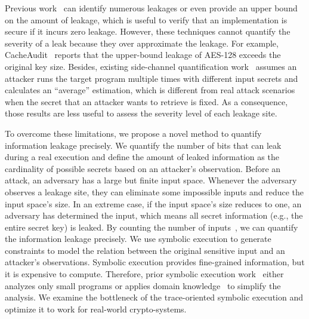 Previous work~\cite{182946,5207642} can identify numerous leakages or even provide an upper bound on the amount of leakage, which is useful to verify that an implementation is secure if it incurs zero leakage.
However, these techniques cannot quantify the severity of a leak because they over approximate the leakage. For example, CacheAudit~\cite{182946}
reports that the upper-bound leakage of AES-128 exceeds the original key size. Besides, existing side-channel quantification work~\cite{182946,5207642} assumes an attacker runs the target program multiple times with different
input secrets and calculates an ``average'' estimation, which is different from real attack scenarios when the secret that an attacker wants to retrieve is fixed. As a consequence, those results are less useful to assess the severity level of each leakage site.

To overcome these limitations, we propose a novel method to quantify information
leakage precisely. We quantify the number of bits that can leak during a real
execution and define the amount of leaked information as the cardinality of
possible secrets based on an attacker's observation. Before an attack, an adversary has a large but finite input space.
Whenever the adversary observes a leakage site, they can eliminate some impossible
inputs and reduce the input space's size. In an extreme case, if the input space's size reduces to one, an adversary has determined the input, which means all secret information (e.g., the entire secret key) is
leaked. By counting the number of inputs~\cite{10.1007/11499107_24}, we can quantify the information leakage precisely.
We use symbolic execution to generate constraints to model the relation
between the original sensitive input and an attacker's observations.
Symbolic execution provides fine-grained information, but it is expensive
to compute. Therefore, prior symbolic
execution work~\cite{203878,236338,Brotzman19Casym} either analyzes only
small programs or applies domain knowledge~\cite{203878} to simplify the analysis. We
examine the bottleneck of the trace-oriented symbolic execution and optimize it
to work for real-world crypto-systems.

